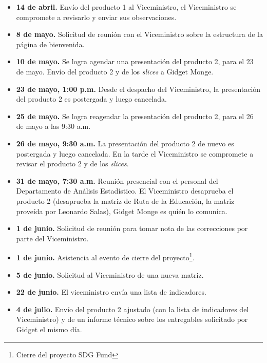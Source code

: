 \documentclass[9pt,a4paper]{IEEEtran}
\begin{document}
\begin{itemize}
	\item \textbf{14 de abril.} Env\'io del producto 1 al Viceministro, el Viceministro se compromete a revisarlo y enviar sus observaciones.

    \item \textbf{8 de mayo.} Solicitud de reuni\'on con el Viceministro sobre la estructura de la p\'agina de bienvenida.

    \item \textbf{10 de mayo.} Se logra agendar una presentaci\'on del producto 2, para el 23 de mayo. Env\'io del producto 2 y de los \emph{slices} a Gidget Monge.

    \item \textbf{23 de mayo, 1:00 p.m.} Desde el despacho del Viceministro, la presentaci\'on del producto 2 es postergada y luego cancelada.

    \item \textbf{25 de mayo.} Se logra reagendar la presentaci\'on del producto 2, para el 26 de mayo a las 9:30 a.m.

    \item \textbf{26 de mayo, 9:30 a.m.} La presentaci\'on del producto 2 de nuevo es postergada y luego cancelada. En la tarde el Viceministro se compromete a revisar el producto 2 y de los \emph{slices}.

    \item \textbf{31 de mayo, 7:30 a.m.} Reuni\'on presencial con el personal del Departamento de An\'alisis Estad\'istico. El Viceministro desaprueba el producto 2 (desaprueba la matriz de Ruta de la Educaci\'on, la matriz prove\'ida por Leonardo Salas), Gidget Monge es qui\'en lo comunica.

    \item \textbf{1 de junio.} Solicitud de reuni\'on para tomar nota de las correcciones por parte del Viceministro.

    \item \textbf{1 de junio.} Asistencia al evento de cierre del proyecto\footnote{Cierre del proyecto SDG Fund}.

    \item \textbf{5 de junio.} Solicitud al Viceministro de una nueva matriz.

    \item \textbf{22 de junio.} El viceministro env\'ia una lista de indicadores.

    \item \textbf{4 de julio.} Env\'io del producto 2 ajustado (con la lista de indicadores del Viceministro) y de un informe t\'ecnico sobre los entregables solicitado por Gidget el mismo d\'ia.
\end{itemize}
\end{document}

